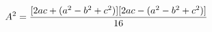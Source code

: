 \documentclass[preview]{standalone}
\begin{document}
\begin{align*}
\special{dvisvgm:raw <g id='unique000'>}A^2 = \frac{[2ac + (a^2-b^2+c^2)][2ac - (a^2-b^2+c^2)]}{16}\special{dvisvgm:raw </g>}
\end{align*}
\end{document}

